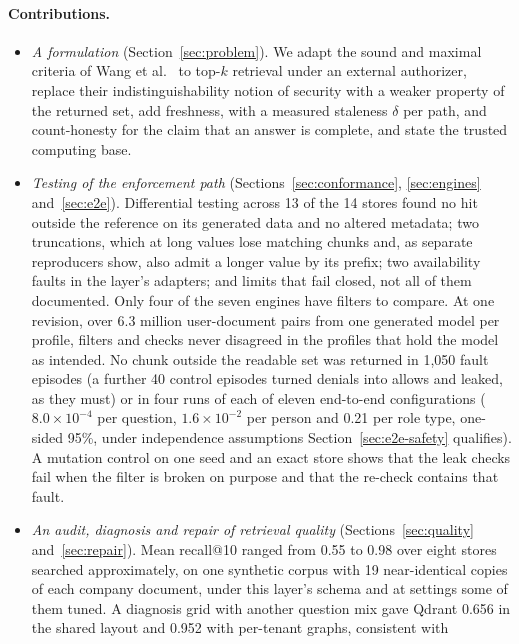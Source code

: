 \paragraph{Contributions.}
\begin{itemize}
  \item \emph{A formulation} (Section~\ref{sec:problem}). We adapt the sound and maximal criteria of Wang et
        al.~\cite{wang2007correctness} to top-$k$ retrieval under an external authorizer, replace their indistinguishability
        notion of security with a weaker property of the returned set, add freshness, with a measured staleness $\delta$
        per path, and count-honesty for the claim that an answer is complete, and state the trusted computing base.
  \item \emph{Testing of the enforcement path} (Sections~\ref{sec:conformance},
        \ref{sec:engines} and~\ref{sec:e2e}). Differential testing across 13 of the 14 stores found no hit outside the
        reference on its generated data and no altered metadata; two truncations, which at long values lose matching chunks and, as separate reproducers show, also admit a longer value by its prefix; two availability faults
        in the layer's adapters; and limits that fail closed, not all of them documented. Only four of the seven engines have filters to compare.
        At one revision, over 6.3 million user-document pairs from one generated model per
        profile, filters and checks never disagreed in the profiles that hold the model as intended. No chunk outside the readable set was returned in 1,050 fault episodes (a further 40 control episodes turned denials into allows and leaked, as they must) or
        in four runs of each of eleven end-to-end configurations ($8.0 \times 10^{-4}$ per question, $1.6 \times 10^{-2}$ per person and
        0.21 per role type, one-sided 95\%, under independence assumptions Section~\ref{sec:e2e-safety} qualifies). A mutation control on one seed and an exact store shows that the leak checks fail when
        the filter is broken on purpose and that the re-check contains that fault.
  \item \emph{An audit, diagnosis and repair of retrieval quality} (Sections~\ref{sec:quality}
        and~\ref{sec:repair}). Mean recall@10 ranged from 0.55 to 0.98 over eight stores searched approximately, on
        one synthetic corpus with 19 near-identical copies of each company document, under this layer's schema and at settings some of them tuned.
        A diagnosis grid with another question mix gave Qdrant 0.656 in the shared layout and 0.952 with per-tenant graphs, consistent with

\end{itemize}
